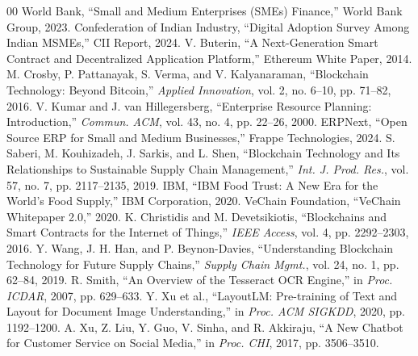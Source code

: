 \documentclass[conference]{IEEEtran}
\begin{document}
\begin{thebibliography}{00}
 World Bank, ``Small and Medium Enterprises (SMEs) Finance,'' World Bank Group, 2023.
 Confederation of Indian Industry, ``Digital Adoption Survey Among Indian MSMEs,'' CII Report, 2024.
 V. Buterin, ``A Next-Generation Smart Contract and Decentralized Application Platform,'' Ethereum White Paper, 2014.
 M. Crosby, P. Pattanayak, S. Verma, and V. Kalyanaraman, ``Blockchain Technology: Beyond Bitcoin,'' \textit{Applied Innovation}, vol. 2, no. 6--10, pp. 71--82, 2016.
 V. Kumar and J. van Hillegersberg, ``Enterprise Resource Planning: Introduction,'' \textit{Commun. ACM}, vol. 43, no. 4, pp. 22--26, 2000.
 ERPNext, ``Open Source ERP for Small and Medium Businesses,'' Frappe Technologies, 2024.
 S. Saberi, M. Kouhizadeh, J. Sarkis, and L. Shen, ``Blockchain Technology and Its Relationships to Sustainable Supply Chain Management,'' \textit{Int. J. Prod. Res.}, vol. 57, no. 7, pp. 2117--2135, 2019.
 IBM, ``IBM Food Trust: A New Era for the World's Food Supply,'' IBM Corporation, 2020.
 VeChain Foundation, ``VeChain Whitepaper 2.0,'' 2020.
 K. Christidis and M. Devetsikiotis, ``Blockchains and Smart Contracts for the Internet of Things,'' \textit{IEEE Access}, vol. 4, pp. 2292--2303, 2016.
 Y. Wang, J. H. Han, and P. Beynon-Davies, ``Understanding Blockchain Technology for Future Supply Chains,'' \textit{Supply Chain Mgmt.}, vol. 24, no. 1, pp. 62--84, 2019.
 R. Smith, ``An Overview of the Tesseract OCR Engine,'' in \textit{Proc. ICDAR}, 2007, pp. 629--633.
 Y. Xu et al., ``LayoutLM: Pre-training of Text and Layout for Document Image Understanding,'' in \textit{Proc. ACM SIGKDD}, 2020, pp. 1192--1200.
 A. Xu, Z. Liu, Y. Guo, V. Sinha, and R. Akkiraju, ``A New Chatbot for Customer Service on Social Media,'' in \textit{Proc. CHI}, 2017, pp. 3506--3510.
\end{thebibliography}
\end{document}
